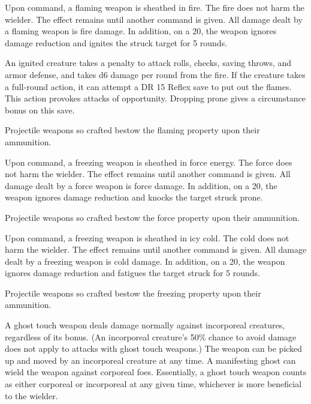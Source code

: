 
 Upon command, a flaming weapon is sheathed in fire. The fire does not harm the wielder. The effect remains until another command is given. All damage dealt by a flaming weapon is fire damage. In addition, on a 20, the weapon ignores damage reduction and ignites the struck target for 5 rounds.
\par An ignited creature takes a  penalty to attack rolls, checks, saving throws, and armor defense, and takes d6 damage per round from the fire. If the creature takes a full-round action, it can attempt a DR 15 Reflex save to put out the flames. This action provokes attacks of opportunity. Dropping prone gives a  circumstance bonus on this save.
\par Projectile weapons so crafted bestow the flaming property upon their ammunition.


 Upon command, a freezing weapon is sheathed in force energy. The force does not harm the wielder. The effect remains until another command is given. All damage dealt by a force weapon is force damage. In addition, on a 20, the weapon ignores damage reduction and knocks the target struck prone.
\par Projectile weapons so crafted bestow the force property upon their ammunition.


 Upon command, a freezing weapon is sheathed in icy cold. The cold does not harm the wielder. The effect remains until another command is given. All damage dealt by a freezing weapon is cold damage. In addition, on a 20, the weapon ignores damage reduction and fatigues the target struck for 5 rounds.
\par Projectile weapons so crafted bestow the freezing property upon their ammunition.


 A ghost touch weapon deals damage normally against incorporeal creatures, regardless of its bonus. (An incorporeal creature's 50\% chance to avoid damage does not apply to attacks with ghost touch weapons.) The weapon can be picked up and moved by an incorporeal creature at any time. A manifesting ghost can wield the weapon against corporeal foes. Essentially, a ghost touch weapon counts as either corporeal or incorporeal at any given time, whichever is more beneficial to the wielder.

